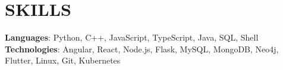 \documentclass[letterpaper,10pt]{article}
\newcommand{\resumeSubHeadingListEnd}{\end{itemize}}
\newcommand{\resumeItemListEnd}{\end{itemize}\vspace{0pt}}
\begin{document}


\section{SKILLS}
 \begin{itemize}[leftmargin=0in, label={}]
    \small{\item{
     \textbf{Languages}{: Python, C++, JavaScript, TypeScript, Java, SQL, Shell} \\
     \textbf{Technologies}{: Angular, React, Node.js, Flask, MySQL, MongoDB, Neo4j, Flutter, Linux, Git, Kubernetes}}}
 \end{itemize}

\end{document}
